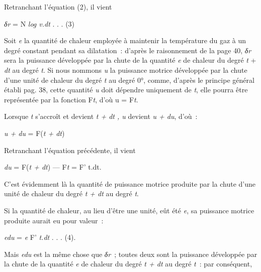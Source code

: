 \documentclass[french,twoside]{book} %
\begin{document}
{ \noindent Retranchant l’équation (2), il vient\par
 
\begin{center}
\noindent \emph{δr} = N \emph{log v.dt} . . . (3)\par
\end{center}

 \noindent Soit \emph{e} la quantité de chaleur employée à maintenir la température du gaz à un degré constant pendant sa dilatation : d’après le raisonnement de la page 40, \emph{δr} sera la puissance développée par la chute de la quantité \emph{e} de chaleur du degré \emph{t} + \emph{dt} au degré \emph{t}. Si nous nommons \emph{u} la puissance motrice développée par la chute d’une unité de chaleur du degré \emph{t} au degré 0°, comme, d’après le principe général établi pag. 38, cette quantité \emph{u} doit dépendre uniquement de \emph{t}, elle pourra être représentée par la fonction F\emph{t}, d’où u = F\emph{t}.\par
 Lorsque \emph{t} s’accroît et devient \emph{t + dt , u} devient \emph{u + du}, d’où :\par
 
\begin{center}
\noindent \emph{u + du} = F(\emph{t + dt})\par
\end{center}

 \noindent Retranchant l’équation précédente, il vient\par
 
\begin{center}
\noindent \emph{du} = F(\emph{t + dt}) — F\emph{t} = F’ t.dt.\par
\end{center}

 \noindent C’est évidemment là la quantité de puissance motrice produite par la chute d’une unité de chaleur du degré \emph{t + dt} au degré \emph{t}.\par
 Si la quantité de chaleur, au lieu d’être une unité, eût été \emph{e}, sa puissance motrice produite aurait eu pour valeur :\par
 
\begin{center}
\noindent \emph{edu} = \emph{e} F’ \emph{t.dt} . . . (4).\par
\end{center}

 \noindent Mais \emph{edu} est la même chose que \emph{δr} ; toutes deux sont la puissance développée par la chute de la quantité \emph{e} de chaleur du degré \emph{t + dt} au degré \emph{t} : par conséquent,\par
 
}
\end{document}
